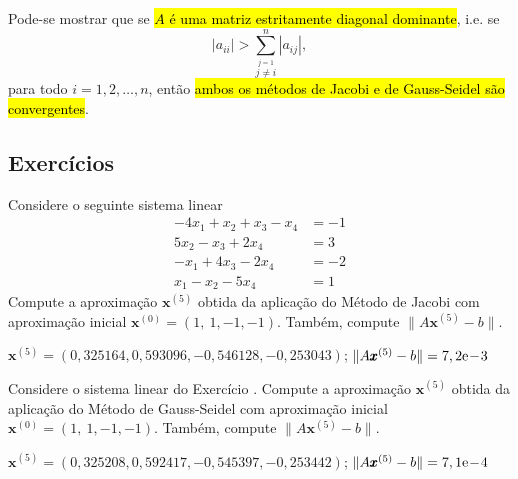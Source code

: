 \begin{obs}{}
  Pode-se mostrar que se \hl{$A$ é uma matriz estritamente diagonal dominante}, i.e. se
  \begin{equation}
    |a_{ii}| > \sum_{\overset{j=1}{j\neq i}}^n |a_{ij}|,
  \end{equation}
para todo $i = 1, 2, \ldots, n$, então \hl{ambos os métodos de Jacobi e de Gauss-Seidel são convergentes}.
\end{obs}

\subsection{Exercícios}

\begin{exer}\label{cap_sislin_sec_jgs:exer:jacobi}
  Considere o seguinte sistema linear
  \begin{align}
    -4x_1 + x_2 + x_3 - x_4 &= -1\\
    5x_2 -x_3 + 2x_4 &= 3\\
    -x_1 + 4x_3 - 2x_4 &= -2\\
    x_1 -x_2 -5x_4 &= 1
  \end{align}
  Compute a aproximação $\pmb{x}^{(5)}$ obtida da aplicação do Método de Jacobi com aproximação inicial $\pmb{x}^{(0)} = (1, ~1, -1, -1)$. Também, compute $\|A\pmb{x}^{(5)} - b\|$.
\end{exer}
\begin{resp}
  $\pmb{x}^{(5)} = (0,325164, 0,593096, -0,546128, -0,253043)$; $\|A\pmb{x}^{(5)}-b\| = 7,2\mathrm{e}\!-\!3$
\end{resp}

\begin{exer}
  Considere o sistema linear do Exercício \label{cap_sislin_sec_jgs:exer:jacobi}. Compute a aproximação $\pmb{x}^{(5)}$ obtida da aplicação do Método de Gauss-Seidel com aproximação inicial $\pmb{x}^{(0)} = (1, ~1, -1, -1)$. Também, compute $\|A\pmb{x}^{(5)} - b\|$.
\end{exer}
\begin{resp}
  $\pmb{x}^{(5)} = (0,325208, 0,592417, -0,545397, -0,253442)$; $\|A\pmb{x}^{(5)}-b\| = 7,1\mathrm{e}\!-\!4$
\end{resp}


